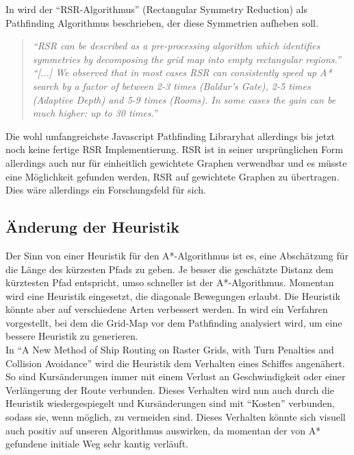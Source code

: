 \documentclass[letterpaper]{article}
\begin{document}
		In \cite{harabor12} wird der "`RSR-Algorithmus"' (Rectangular Symmetry Reduction) als Pathfinding Algorithmus beschrieben, der diese Symmetrien aufheben soll.\\

		\begin{quote}
			\textit{"`RSR can be described as a pre-processing algorithm which identifies symmetries by decomposing the grid map into empty rectangular regions."'}\cite[p. 2]{harabor12}\\

			\textit{"`[...] We observed that in most cases RSR can consistently speed up A* search by a factor of between 2-3 times (Baldur's Gate), 2-5 times (Adaptive Depth) and 5-9 times (Rooms). In some cases the gain can be much higher: up to 30 times."'}\cite[p. 4]{harabor12}
		\end{quote}

		Die wohl umfangreichste Javascript Pathfinding Library\footnotemark hat allerdings bis jetzt noch keine fertige RSR Implementierung. RSR ist in seiner ursprünglichen Form allerdings auch nur für einheitlich gewichtete Graphen verwendbar und es müsste eine Möglichkeit gefunden werden, RSR auf gewichtete Graphen zu übertragen. Dies wäre allerdings ein Forschungsfeld für sich.


	\subsection{Änderung der Heuristik}
		Der Sinn von einer Heuristik für den A*-Algorithmus ist es, eine Abschätzung für die Länge des kürzesten Pfads zu geben. Je besser die geschätzte Distanz dem kürztesten Pfad entspricht, umso schneller ist der A*-Algorithmus. Momentan wird eine Heuristik eingesetzt, die diagonale Bewegungen erlaubt. Die Heuristik könnte aber auf verschiedene Arten verbessert werden. In \cite{andrew04} wird ein Verfahren vorgestellt, bei dem die Grid-Map vor dem Pathfinding analysiert wird, um eine bessere Heuristik zu generieren.\\

		In "`A New Method of Ship Routing on Raster Grids, with Turn Penalties and Collision Avoidance"'\cite{szlapczynski06} wird die Heuristik dem Verhalten eines Schiffes angenähert. So sind Kursänderungen immer mit einem Verlust an Geschwindigkeit oder einer Verlängerung der Route verbunden. Dieses Verhalten wird nun auch durch die Heuristik wiedergespiegelt und Kursänderungen sind mit "`Kosten"' verbunden, sodass sie, wenn möglich, zu vermeiden sind. Dieses Verhalten könnte sich visuell auch positiv auf unseren Algorithmus auswirken, da momentan der von A* gefundene initiale Weg sehr kantig verläuft.
\end{document}
